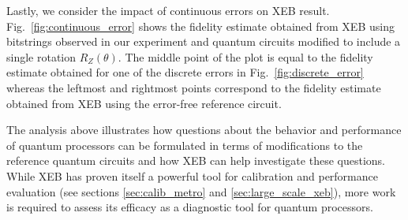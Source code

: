 Lastly, we consider the impact of continuous errors on XEB result. Fig.~\ref{fig:continuous_error} shows the fidelity estimate obtained from XEB using bitstrings observed in our experiment and quantum circuits modified to include a single rotation $R_Z(\theta)$. The middle point of the plot is equal to the fidelity estimate obtained for one of the discrete errors in Fig.~\ref{fig:discrete_error} whereas the leftmost and rightmost points correspond to the fidelity estimate obtained from XEB using the error-free reference circuit.

The analysis above illustrates how questions about the behavior and performance of quantum processors can be formulated in terms of modifications to the reference quantum circuits and how XEB can help investigate these questions. While XEB has proven itself a powerful tool for calibration and performance evaluation (see sections \ref{sec:calib_metro} and \ref{sec:large_scale_xeb}), more work is required to assess its efficacy as a diagnostic tool for quantum processors.